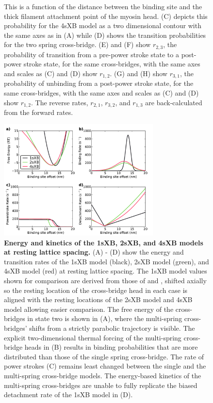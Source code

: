 \documentclass[]{article}
\begin{document}
\begin{figure}[ht]
\begin{center}
{        This is a function of the distance between the binding site and the thick filament attachment point of the myosin head.  
        (C) depicts this probability for the 4sXB model as a two dimensional contour with the same axes as in (A) while (D) shows the transition probabilities for the two spring cross-bridge.  
        (E) and (F) show $r_{2,3}$, the probability of transition from a pre-power stroke state to a post-power stroke state, for the same cross-bridges, with the same axes and scales as (C) and (D) show $r_{1,2}$.
        (G) and (H) show $r_{3,1}$, the probability of unbinding from a post-power stroke state, for the same cross-bridges, with the same axes and scales as (C) and (D) show $r_{1,2}$. 
        The reverse rates, $r_{2,1}$, $r_{3,2}$, and $r_{1,3}$ are back-calculated from the forward rates.
    }
    \end{center}
\end{figure}

\begin{figure}[ht]
    \begin{center}
    \includegraphics[width=3.2in]{../imgs/Figure3.pdf}
    \caption{
        \label{fig_kinetics_cuts}
        \textbf{Energy and kinetics of the 1sXB, 2sXB, and 4sXB models at resting lattice spacing.}
        (A) - (D) show the energy and transition rates of the 1sXB model (black), 2sXB model (green), and 4sXB model (red) at resting lattice spacing.  
        The 1sXB model values shown for comparison are derived from those of \citet{Daniel1998} and \citet{Tanner2007}, shifted axially so the resting location of the cross-bridge head in each case is aligned with the resting locations of the 2sXB model and 4sXB model allowing easier comparison. 
        The free energy of the cross-bridges in state two is shown in (A), where the multi-spring cross-bridges' shifts from a strictly parabolic trajectory is visible. 
        The explicit two-dimensional thermal forcing of the multi-spring cross-bridge heads in (B) results in binding probabilities that are more distributed than those of the single spring cross-bridge.
        The rate of power strokes (C) remains least changed between the single and the multi-spring cross-bridge models.  
        The energy-based kinetics of the multi-spring cross-bridges are unable to fully replicate the biased detachment rate of the 1sXB model in (D).
    }
    \end{center}
\end{figure}
\end{document}
